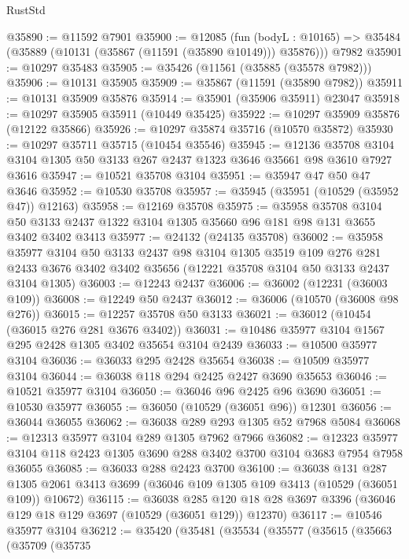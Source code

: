 \begin{lexlean}{RustStd}
\begin{coremodule}
@35890 := @11592 @7901
@35900 := @12085
    (fun (bodyL : @10165) => @35484 (@35889 (@10131 (@35867 (@11591 (@35890 @10149))) @35876)))
    @7982
@35901 := @10297 @35483
@35905 := @35426 (@11561 (@35885 (@35578 @7982)))
@35906 := @10131 @35905
@35909 := @35867 (@11591 (@35890 @7982))
@35911 := @10131 @35909 @35876
@35914 := @35901 (@35906 @35911) @23047
@35918 := @10297 @35905 @35911 (@10449 @35425)
@35922 := @10297 @35909 @35876 (@12122 @35866)
@35926 := @10297 @35874 @35716 (@10570 @35872)
@35930 := @10297 @35711 @35715 (@10454 @35546)
@35945 := @12136
    @35708
    @3104
    @3104
    @1305
    @50
    @3133
    @267
    @2437
    @1323
    @3646
    @35661
    @98
    @3610
    @7927
    @3616
@35947 := @10521 @35708 @3104
@35951 := @35947 @47 @50 @47 @3646
@35952 := @10530 @35708
@35957 := @35945 (@35951 (@10529 (@35952 @47)) @12163)
@35958 := @12169 @35708
@35975 := @35958
    @35708
    @3104
    @50
    @3133
    @2437
    @1322
    @3104
    @1305
    @35660
    @96
    @181
    @98
    @131
    @3655
    @3402
    @3402
    @3413
@35977 := @24132 (@24135 @35708)
@36002 := @35958
    @35977
    @3104
    @50
    @3133
    @2437
    @98
    @3104
    @1305
    @3519
    @109
    @276
    @281
    @2433
    @3676
    @3402
    @3402
    @35656
    (@12221 @35708 @3104 @50 @3133 @2437 @3104 @1305)
@36003 := @12243 @2437
@36006 := @36002 (@12231 (@36003 @109))
@36008 := @12249 @50 @2437
@36012 := @36006 (@10570 (@36008 @98 @276))
@36015 := @12257 @35708 @50 @3133
@36021 := @36012 (@10454 (@36015 @276 @281 @3676 @3402))
@36031 := @10486 @35977 @3104 @1567 @295 @2428 @1305 @3402 @35654 @3104 @2439
@36033 := @10500 @35977 @3104
@36036 := @36033 @295 @2428 @35654
@36038 := @10509 @35977 @3104
@36044 := @36038 @118 @294 @2425 @2427 @3690 @35653
@36046 := @10521 @35977 @3104
@36050 := @36046 @96 @2425 @96 @3690
@36051 := @10530 @35977
@36055 := @36050 (@10529 (@36051 @96)) @12301
@36056 := @36044 @36055
@36062 := @36038 @289 @293 @1305 @52 @7968 @5084
@36068 := @12313 @35977 @3104 @289 @1305 @7962 @7966
@36082 := @12323 @35977 @3104 @118 @2423 @1305 @3690 @288 @3402 @3700 @3104 @3683 @7954 @7958 @36055
@36085 := @36033 @288 @2423 @3700
@36100 := @36038
    @131
    @287
    @1305
    @2061
    @3413
    @3699
    (@36046 @109 @1305 @109 @3413 (@10529 (@36051 @109)) @10672)
@36115 := @36038
    @285
    @120
    @18
    @28
    @3697
    @3396
    (@36046 @129 @18 @129 @3697 (@10529 (@36051 @129)) @12370)
@36117 := @10546 @35977 @3104
@36212 := @35420
    (@35481
      (@35534
        (@35577
          (@35615
            (@35663
              (@35709
                (@35735

\end{coremodule}
\end{lexlean}
